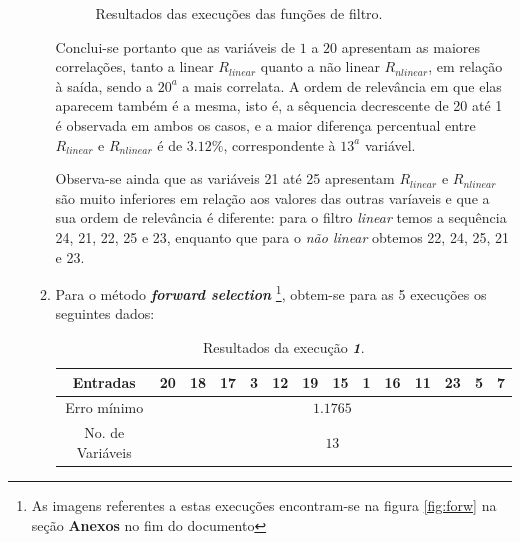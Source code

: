 \begin{enumerate}
\begin{enumerate}
\begin{figure}[h!]
				\caption{Resultados das execuções das funções de filtro.}
				\end{figure}
				
				
			\FloatBarrier
				
			Conclui-se portanto que as variáveis de \(1\) a \(20\) apresentam as maiores
			correlações, tanto a linear \(R_{linear}\) quanto a não linear \(R_{nlinear}\),
			em relação à saída, sendo a \(20^a\) a mais correlata. A ordem de relevância em
			que elas aparecem também é a mesma, isto é, a sêquencia decrescente de 20 até 1
			é observada em ambos os casos, e a maior diferença percentual entre
			\(R_{linear}\) e \(R_{nlinear}\) é de \(3.12\%\), correspondente à \(13^a\)
			variável.
				
				\vspace{12pt}
				
			Observa-se ainda que as variáveis 21 até 25 apresentam \(R_{linear}\) e
			\(R_{nlinear}\) são muito inferiores em relação aos valores das outras varíaveis
			e que a sua ordem de relevância é diferente: para o filtro \textit{linear} temos
			a sequência 24, 21, 22, 25 e 23, enquanto que para o \textit{não linear} obtemos
			22, 24, 25, 21 e 23.
			
			
			\item 
			\label{item:forwsunspot}
			Para o método \textbf{\textit{forward selection}} \footnote{As
			imagens referentes a estas execuções encontram-se na figura \ref{fig:forw}
			na seção \textbf{Anexos} no fim do documento}, obtem-se para as 5 execuções os seguintes dados:
			
			\begin{table}[H]
				    \centering
				    \footnotesize
					\caption{\label{tab:forward1_sunspot} Resultados da execução
					\textit{\textbf{1}}.}
				    \vspace{-6pt}
					\begin{tabular}{|c | c | c | c | c | c | c | c | c | c | c | c | c | c|}
					\hline
					Entradas & 20 & 18 & 17 & 3 & 12 & 19 & 15 & 1 & 16 & 11 & 23 & 5 & 7 \\
					\hline
					Erro mínimo & \multicolumn{13}{c|}{\(1.1765\)}  \\ \hline
					No. de Variáveis & \multicolumn{13}{c|}{\(13\)}  \\
					\hline
					
					\end{tabular}	    
			    \end{table}    

		\vspace{-12pt}


\end{enumerate}
\end{enumerate}
